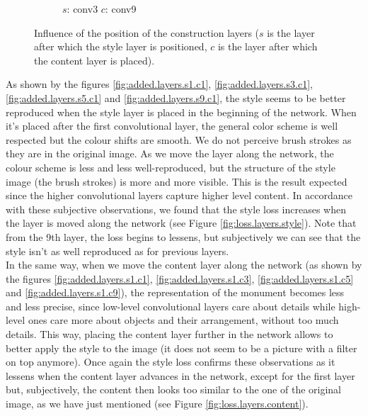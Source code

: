 \documentclass[twocolumn,superscriptaddress,aps,floatfix, nofootinbib]{revtex4-1}
\begin{document}
\begin{figure}[ht]
\begin{subfigure}[b]{0.1\textwidth}
            \caption{$s$: conv3 $c$: conv9}
            \label{fig:added.layers.s3.c9}
        \end{subfigure}
        \caption{Influence of the position of the construction layers ($s$ is the layer after which the style layer is positioned, $c$ is the layer after which the content layer is placed).}
        \label{fig:added.layers}
    \end{figure}
    
    As shown by the figures \ref{fig:added.layers.s1.c1}, \ref{fig:added.layers.s3.c1}, \ref{fig:added.layers.s5.c1} and \ref{fig:added.layers.s9.c1}, the style seems to be better reproduced when the style layer is placed in the beginning of the network. When it's placed after the first convolutional layer, the general color scheme is well respected but the colour shifts are smooth. We do not perceive brush strokes as they are in the original image. As we move the layer along the network, the colour scheme is less and less well-reproduced, but the structure of the style image (the brush strokes) is more and more visible. This is the result expected since the higher convolutional layers capture higher level content. In accordance with these subjective observations, we found that the style loss increases when the layer is moved along the network (see Figure \ref{fig:loss.layers.style}). Note that from the 9th layer, the loss begins to lessens, but subjectively we can see that the style isn't as well reproduced as for previous layers.\\
    
    In the same way, when we move the content layer along the network (as shown by the figures \ref{fig:added.layers.s1.c1}, \ref{fig:added.layers.s1.c3}, \ref{fig:added.layers.s1.c5} and \ref{fig:added.layers.s1.c9}), the representation of the monument becomes less and less precise, since low-level convolutional layers care about details while high-level ones care more about objects and their arrangement, without too much details. This way, placing the content layer  further in the network allows to better apply the style to the image (it does not seem to be a picture with a filter on top anymore). Once again the style loss confirms these observations as it lessens when the content layer advances in the network, except for the first layer but, subjectively, the content then looks too similar to the one of the original image, as we have just mentioned (see Figure \ref{fig:loss.layers.content}).\\
\end{document}
